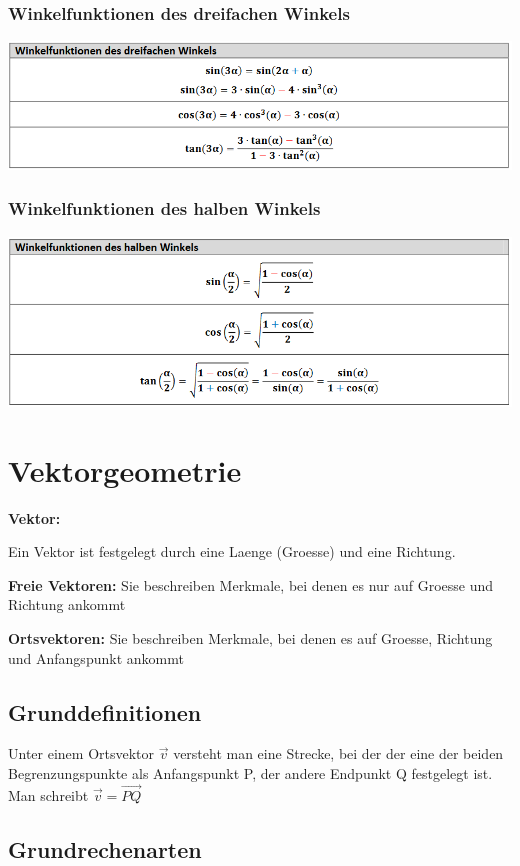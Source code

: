 \subsubsection{Winkelfunktionen des dreifachen Winkels}
\includegraphics[scale=0.7]{gon4.PNG}

\subsubsection{Winkelfunktionen des halben Winkels}
\includegraphics[scale=0.7]{gon5.PNG}

\section{Vektorgeometrie}
\textbf{Vektor:}

Ein Vektor ist festgelegt durch eine Laenge (Groesse) und eine Richtung.

\textbf{Freie Vektoren: }
Sie beschreiben Merkmale,
bei denen es nur auf Groesse und Richtung ankommt

\textbf{Ortsvektoren:}
Sie beschreiben Merkmale,
bei denen es auf Groesse, Richtung und Anfangspunkt ankommt

\subsection{Grunddefinitionen}
Unter einem Ortsvektor $\vec{v}$  versteht man eine Strecke, bei der der eine der beiden Begrenzungspunkte als Anfangspunkt P, der andere Endpunkt Q festgelegt ist. Man schreibt $\vec{v} = \vec{PQ}$

\subsection{Grundrechenarten}
